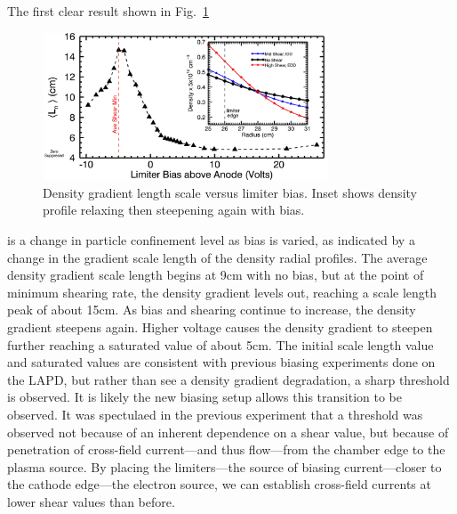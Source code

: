 \documentclass[%
 aps,
 prl,
 amsmath,amssymb,
 reprint,%
]{revtex4-1}
\begin{document}

The first clear result shown in
Fig.~\ref{fig:densgrad}
\begin{center}
\begin{figure}
\includegraphics[width=8.5cm]{densgrad.pdf}%
\caption{\label{fig:densgrad} Density gradient length scale versus limiter bias. Inset shows density profile relaxing then steepening again with bias.}
\end{figure}
\end{center}
is a change in particle confinement level as bias is varied, as indicated by a change in the gradient scale length of the density radial profiles. The average density gradient scale length begins at 9cm with no bias, but at the point of minimum shearing rate, the density gradient levels out, reaching a scale length peak of about 15cm. As bias and shearing continue to increase, the density gradient steepens again. Higher voltage causes the density gradient to steepen further reaching a saturated value of about 5cm. The initial scale length value and saturated values are consistent with previous biasing experiments done on the LAPD\cite{carter09}, but rather than see a density gradient degradation, a sharp threshold is observed. It is likely the new biasing setup allows this transition to be observed. It was spectulaed in the previous experiment that a threshold was observed not because of an inherent dependence on a shear value, but because of penetration of cross-field current---and thus flow---from the chamber edge to the plasma source. By placing the limiters---the source of biasing current---closer to the cathode edge---the electron source, we can establish cross-field currents at lower shear values than before.
\end{document}
